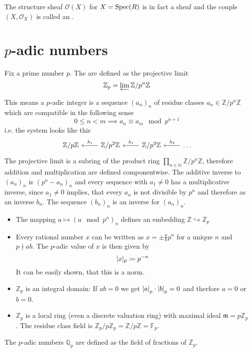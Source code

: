The structure sheaf $\mathcal{O}(X)$ for $X=\Spec(R)$ is in fact a sheaf and the couple $(X, \mathcal{O}_X)$ is called an .

\section{$p$-adic numbers}
\label{sec:p-adic numbers}

\begin{definition}
	Fix a prime number $p$.
	The  are defined as the projective limit
	\[
		\mathbb{Z}_p = \varprojlim \mathbb{Z}/p^n \mathbb{Z}
	\]
\end{definition}
This means a $p$-adic integer is a sequence $(a_n)_n$ of residue classes $a_n \in \mathbb{Z}/p^n \mathbb{Z}$ which are compatible in the following sense
\[
	0 \le n < m \implies a_n \equiv a_m \mod p^{n+1}
\]
i.e. the system looks like this
\[
	\begin{tikzcd}
		\mathbb{Z}/p \mathbb{Z} & \mathbb{Z}/p^2 \mathbb{Z} \lar["\lambda_1"'] & \mathbb{Z}/p^3 \mathbb{Z} \lar["\lambda_1"'] & \ldots \lar["\lambda_3"']
	\end{tikzcd}
\]
The projective limit is a subring of the product ring $\prod_{n \in \mathbb{N}} \mathbb{Z}/p^n \mathbb{Z}$, therefore addition and multiplication are defined componentwise.
The additive inverse to $(a_n)_n$ is $(p^n - a_n)_n$ and every sequence with $a_1 \neq 0$ has a multiplicative inverse, since $a_1 \neq 0$ implies, that every $a_n$ is not divisible by $p^n$ and therefore as an inverse $b_n$.
The sequence $(b_n)_n$ is an inverse for $(a_n)_n$.

\begin{itemize}
	\item The mapping $a \mapsto (a \mod p^n)_n$ defines an embedding $\mathbb{Z} \hookrightarrow \mathbb{Z}_p$
	\item Every rational number $x$ can be written as $x = \pm \frac{a}{b} p^n$ for a unique $n$ and $p \nmid ab$.
	The $p$-adic value of $x$ is then given by
	\[
		\abs{x}_p \coloneqq p^{-n}
	\]
	It can be easily shown, that this is a norm.
	\item $\mathbb{Z}_p$ is an integral domain: If $ab=0$ we get $\abs*{a}_p \cdot \abs*{b}_p = 0$ and therfore $a=0$ or $b=0$.
	\item $\mathbb{Z}_p$ is a local ring (even a discrete valuation ring) with maximal ideal $\mathfrak{m} = p \mathbb{Z}_p$.
	The residue class field is $\mathbb{Z}_p/p \mathbb{Z}_p = \mathbb{Z}/p \mathbb{Z} = \mathbb{F}_p$.
\end{itemize}

\begin{definition}
	The $p$-adic numbers $\mathbb{Q}_p$ are defined as the field of fractions of $\mathbb{Z}_p$.
\end{definition}




\cleardoubleoddemptypage%
\setcounter{page}{1}
\appendix%
\printbibliography%
\printindex%
\todototoc%
\listoftodos[To-do's]

